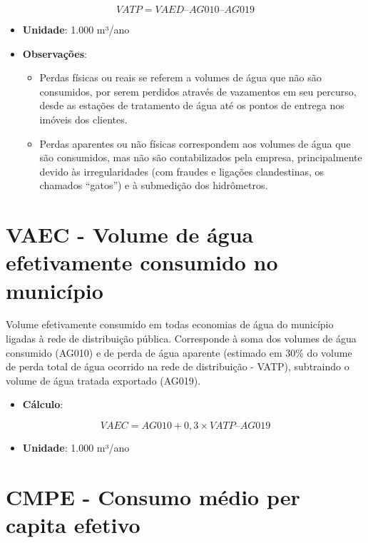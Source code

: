\documentclass[]{book}
\providecommand{\tightlist}{%
  \setlength{\itemsep}{0pt}\setlength{\parskip}{0pt}}
\begin{document}
\[
VATP = VAED – AG010 – AG019
\]

\begin{itemize}
\item
  \textbf{Unidade}: 1.000 m³/ano
\item
  \textbf{Observações}:

  \begin{itemize}
  \tightlist
  \item
    Perdas físicas ou reais se referem a volumes de água que não são consumidos, por serem perdidos através de vazamentos em seu percurso, desde as estações de tratamento de água até os pontos de entrega nos imóveis dos clientes.
  \item
    Perdas aparentes ou não físicas correspondem aos volumes de água que são consumidos, mas não são contabilizados pela empresa, principalmente devido às irregularidades (com fraudes e ligações clandestinas, os chamados ``gatos'') e à submedição dos hidrômetros.
  \end{itemize}
\end{itemize}

\hypertarget{vaec---volume-de-uxe1gua-efetivamente-consumido-no-municuxedpio}{%
\section*{VAEC - Volume de água efetivamente consumido no município}\label{vaec---volume-de-uxe1gua-efetivamente-consumido-no-municuxedpio}}

Volume efetivamente consumido em todas economias de água do município ligadas à rede de distribuição pública. Corresponde à soma dos volumes de água consumido (AG010) e de perda de água aparente (estimado em 30\% do volume de perda total de água ocorrido na rede de distribuição - VATP), subtraindo o volume de água tratada exportado (AG019).

\begin{itemize}
\tightlist
\item
  \textbf{Cálculo}:
\end{itemize}

\[
VAEC = AG010 + 0,3 \times VATP – AG019
\]

\begin{itemize}
\tightlist
\item
  \textbf{Unidade}: 1.000 m³/ano
\end{itemize}

\hypertarget{cmpe---consumo-muxe9dio-per-capita-efetivo}{%
\section*{CMPE - Consumo médio per capita efetivo}\label{cmpe---consumo-muxe9dio-per-capita-efetivo}}
\end{document}
